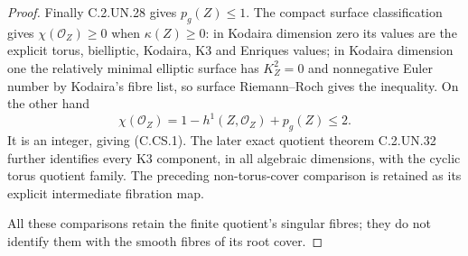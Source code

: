\begin{proof}
Finally C.2.UN.28 gives $p_g(Z)\le1$.
The compact surface classification
gives $\chi(\mathcal O_Z)\ge0$ when
$\kappa(Z)\ge0$: in Kodaira dimension
zero its values are the explicit
torus, bielliptic, Kodaira, K3 and
Enriques values; in Kodaira dimension
one the relatively minimal elliptic
surface has $K_Z^2=0$ and nonnegative
Euler number by Kodaira's fibre list,
so surface Riemann--Roch gives the
inequality. On the other hand
\[
        \chi(\mathcal O_Z)=1-h^1(Z,\mathcal O_Z)+p_g(Z)
                              \le2.
                                                               \tag{C.CS.6}
\]
It is an integer, giving (C.CS.1).
The later exact quotient theorem
C.2.UN.32 further identifies every K3
component, in all algebraic dimensions,
with the cyclic torus quotient family.
The preceding non-torus-cover comparison
is retained as its explicit intermediate
fibration map.

All these comparisons retain the
finite quotient's singular fibres;
they do not identify them with the
smooth fibres of its root cover.
\end{proof}
